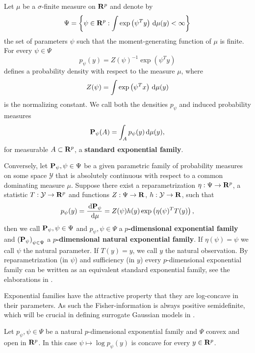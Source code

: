\begin{definition}
    Let $\mu$ be a $\sigma$-finite measure on $\R^{p}$ and denote by 
    $$\Psi = \left\{\psi \in \R^{p} : \int \exp \left( \psi^{T} y \right) \d\mu(y) < \infty\right\}$$
    the set of parameters $\psi$ such that the moment-generating function of $\mu$ is finite. 
    For every $\psi \in \Psi$ $$p_{\psi}(y) = Z(\psi)^{-1} \exp (\psi^{T} y)$$ defines a probability density with respect to the measure $\mu$, where $$Z(\psi) = \int \exp \left( \psi^{T} x \right) \d\mu(y)$$ is the normalizing constant. 
    We call both the densities $p_{\psi}$ and induced probability measures $$ \P_{\psi} (A) = \int_{A} p_{\psi}(y) \d \mu(y),$$ for measurable $A \subset \R^{p}$, a \textbf{standard exponential family}.

    Conversely, let $\P_{\psi}, \psi \in \Psi$ be a given parametric family of probability measures on some space $\mathcal Y$ that is absolutely continuous with respect to a common dominating measure $\mu$. Suppose there exist a reparametrization $\eta : \Psi \to \R^{p}$, a statistic $T: \mathcal Y \to \R^{p}$ and functions $Z: \Psi\to \R$, $h:\mathcal Y \to \R$, such that
    $$
        p_{\psi}(y) = \frac{\d \P_{\psi}}{\d \mu} = Z(\psi) h(y) \exp \left(\eta(\psi)^{T}T(y)\right),
    $$
    then we call $\P_{\psi}, \psi \in \Psi$ and $p_{\psi}, \psi \in \Psi$ a \textbf{$p$-dimensional exponential family} and $\left(\P_{\psi}\right)_{\psi\in\Psi}$ a \textbf{$p$-dimensional natural exponential family}. If $\eta(\psi) = \psi$ we call $\psi$ the natural parameter. If $T(y) = y$, we call $y$ the natural observation. By reparametrization (in $\psi$) and sufficiency (in $y$) every $p$-dimensional exponential family can be written as an equivalent standard exponential family, see the elaborations in \citep[Chapter 1]{Brown1986Fundamentals}.
\end{definition}

Exponential families have the attractive property that they are log-concave in their parameters. As such the Fisher-information is always positive semidefinite, which will be crucial in defining surrogate Gaussian models in .
\begin{lemma}
    \label{lem:log-concavity}
    Let $p_{\psi}, \psi \in \Psi$ be a natural $p$-dimensional exponential family and $\Psi$ convex and open in $\R^{p}$. In this case $\psi \mapsto \log p_{\psi}(y)$ is concave for every $y \in \R^{p}$.
\end{lemma}

